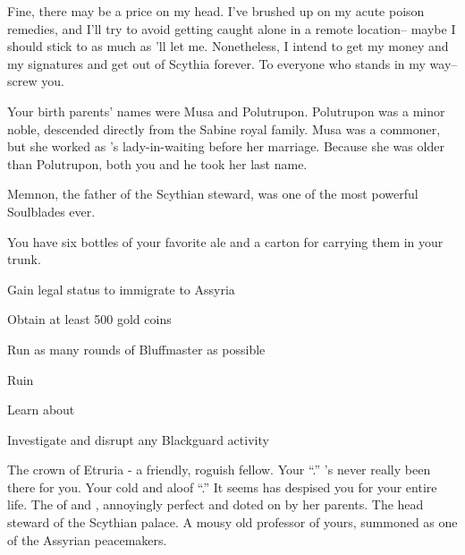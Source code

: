 \documentclass[char]{Kos}
\begin{document}
Fine, there may be a price on my head. I've brushed up on my acute poison remedies, and I'll try to avoid getting caught alone in a remote location-- maybe I should stick to \cPoet{} as much as \cPoet{\they}'ll let me. Nonetheless, I intend to get my money and my signatures and get out of Scythia forever. To everyone who stands in my way-- screw you.


\begin{itemz}[Notes]
  \item Your birth parents' names were Musa and Polutrupon. Polutrupon was a minor noble, descended directly from the Sabine royal family. Musa was a commoner, but she worked as \cScythiaQueen{}'s lady-in-waiting before her marriage. Because she was older than Polutrupon, both you and he took her last name.
  \item Memnon, the father of the Scythian steward, was one of the most powerful Soulblades ever.
  \item You have six bottles of your favorite ale and a carton for carrying them in your trunk.
\end{itemz}

\begin{itemz}[Goals]
\item Gain legal status to immigrate to Assyria
\item Obtain at least 500 gold coins
\item Run as many rounds of Bluffmaster as possible
\item Ruin \cBride{}
\item Learn about \cAnarchist{}
\item Investigate and disrupt any Blackguard activity
\end{itemz}

\begin{contacts}
\contact{\cPoet{}} The crown \cPoet{\prince} of Etruria - a friendly, roguish fellow.
\contact{\cScythiaKing{}} Your ``\cScythiaKing{\parent}.'' \cScythiaKing{\They}'s never really been there for you.
\contact{\cScythiaQueen{}} Your cold and aloof ``\cScythiaQueen{\parent}.'' It seems \cScythiaQueen{\they} has despised you for your entire life.
\contact{\cBride{}} The \cBride{\offspring} of \cScythiaKing{} and \cScythiaQueen{}, annoyingly perfect and doted on by her parents.
\contact{\cButler{}} The head steward of the Scythian palace.
\contact{\cAnarchist{}} A mousy old professor of yours, summoned as one of the Assyrian peacemakers.
\end{contacts}
\end{document}
